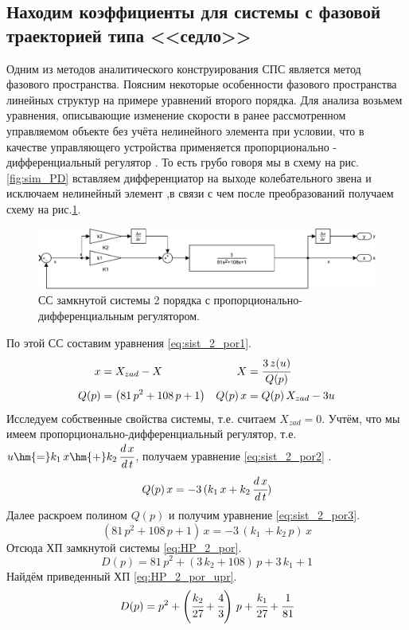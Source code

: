 \subsection{Находим коэффициенты для системы с фазовой траекторией типа <<седло>>}
Одним из методов аналитического конструирования  СПС является метод фазового пространства. 
Поясним некоторые особенности фазового пространства линейных структур на примере уравнений второго порядка. Для анализа возьмем уравнения, описывающие изменение скорости в ранее рассмотренном управляемом объекте без учёта нелинейного элемента при условии, что в качестве управляющего устройства применяется пропорционально - дифференциальный регулятор .
То есть грубо говоря мы в схему на рис.\ref{fig:sim_PD} вставляем дифференциатор на выходе колебательного звена и исключаем нелинейный элемент ,в связи с чем после преобразований получаем схему на рис.\ref{fig:sim_linear_2_por}.
\begin{figure}[!h]\centering
\includegraphics[width=1.0\linewidth]{images/sim_linear_2_por}
\caption{СС замкнутой системы 2 порядка с пропорционально-дифференциальным регулятором.}\label{fig:sim_linear_2_por}
\end{figure}

По этой СС составим уравнения \eqref{eq:sist_2_por1}.
\begin{equation}
    \begin{aligned} \label{eq:sist_2_por1}
       x&=X_{zad}-X & X&=\cfrac{3\,z(u)}{Q(p)}\\
       Q(p)&=\left(81\,p^2+108\,p+1\right)&Q(p)\,x&=Q(p)\,X_{zad}-3u\\
    \end{aligned}
\end{equation}
Исследуем собственные свойства системы, т.е. считаем $X_{zad}=0$.
 Учтём, что мы имеем пропорционально-дифференциальный регулятор, т.е. $u\hm{=}k_1\,x\hm{+}k_2\,\cfrac{d\,x}{d\,t}$, получаем уравнение
 \eqref{eq:sist_2_por2}
.
\begin{equation} \label{eq:sist_2_por2}
Q(p)\,x=-3\,(k_1\,x+k_2\,\cfrac{d\,x}{d\,t})
\end{equation}
Далее раскроем полином $Q(p)$ и получим уравнение \eqref{eq:sist_2_por3}.
\begin{equation} \label{eq:sist_2_por3}
\left(81\,p^2+108\,p+1\right)\,x=-3\,\left(k_1\,+k_2\,p\right)\,x
\end{equation}
Отсюда ХП замкнутой системы  \eqref{eq:HP_2_por}.
\begin{equation} \label{eq:HP_2_por}
D(p)=81\,p^2+\left(3\,k_{2}+108\right)\,p+3\,k_{1}+1
\end{equation}
Найдём приведенный ХП  \eqref{eq:HP_2_por_upr}.
\begin{equation} \label{eq:HP_2_por_upr}
D(p)=p^2+\left(\cfrac{k_{2}}{27}+\cfrac{4}{3}\right)\,p+\cfrac{k_{1}}{27}+\cfrac{1}{81}
\end{equation}

